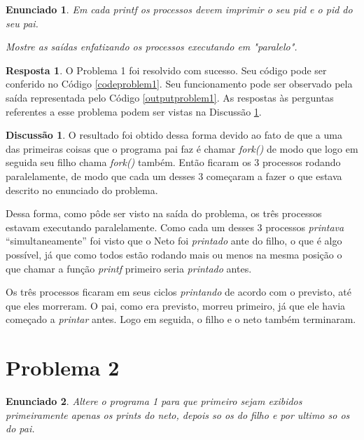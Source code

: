 \documentclass[a4paper, 10pt]{article}
\theoremstyle{plain}
\newtheorem{statement}{Enunciado}
\theoremstyle{definition}
\newtheorem{discussion}{Discussão}
\theoremstyle{definition}
\newtheorem{answer}{Resposta}
\begin{document}
\begin{multicols}{2}
\begin{statement}
Em cada printf os processos devem imprimir o seu pid e o pid do seu pai.

Mostre as saídas enfatizando os processos executando em "paralelo".
\end{statement}

\begin{answer}
O Problema 1 foi resolvido com sucesso. Seu código pode ser conferido no Código \ref{codeproblem1}. Seu funcionamento pode ser observado pela saída representada pelo Código \ref{outputproblem1}. As respostas às perguntas referentes a esse problema podem ser vistas na Discussão \ref{dicussionproblem1}.
\end{answer}

%
%
%
\begin{discussion}
\label{dicussionproblem1}
O resultado foi obtido dessa forma devido ao fato de que a uma das primeiras coisas que o programa pai faz é chamar \textit{fork()} de modo que logo em seguida seu filho chama \textit{fork()} também. Então ficaram os 3 processos rodando paralelamente, de modo que cada um desses 3 começaram a fazer o que estava descrito no enunciado do problema.

Dessa forma, como pôde ser visto na saída do problema, os três processos estavam executando paralelamente. Como cada um desses 3 processos \textit{printava} ``simultaneamente'' foi visto que o Neto foi \textit{printado} ante do filho, o que é algo possível, já que como todos estão rodando mais ou menos na mesma posição o que chamar a função \textit{printf} primeiro seria \textit{printado} antes.

Os três processos ficaram em seus ciclos \textit{printando} de acordo com o previsto, até que eles morreram. O pai, como era previsto, morreu primeiro, já que ele havia começado a \textit{printar} antes. Logo em seguida, o filho e o neto também terminaram.
\end{discussion}


\section*{Problema  2}

\begin{statement}
Altere o programa 1 para que primeiro sejam exibidos primeiramente apenas os prints do neto, depois so os do filho e por ultimo so os do pai.
\end{statement}


\end{multicols}
\end{document}
